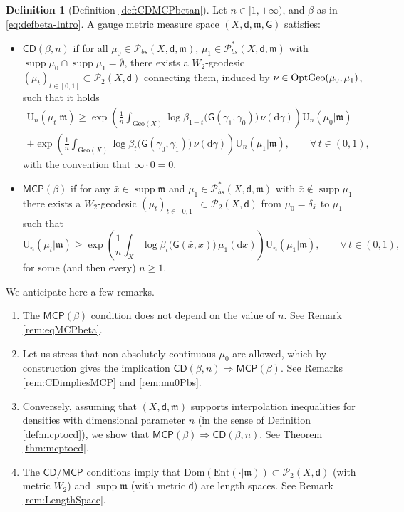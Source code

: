 \documentclass[11pt,a4paper]{article}
\theoremstyle{plain}
\theoremstyle{definition}
\newtheorem*{definition*}{Definition}
\theoremstyle{remark}
\numberwithin{equation}{section}
\DeclareMathOperator{\supp}{\mathrm{supp}}
\newcommand{\CD}{\mathsf{CD}}
\newcommand{\Geo}{\mathrm{Geo}}
\newcommand{\MCP}{\mathsf{MCP}}
\newcommand{\OptGeo}{{\rm OptGeo}}
\newcommand{\Ent}{\mathrm{Ent}}
\newcommand{\U}{\mathrm{U}}
\newcommand{\Dom}{\mathrm{Dom}}
\newcommand{\Prob}{\mathcal{P}}
\newcommand{\di}{\mathrm{d}}
\newcommand{\mm}{\mathfrak m}
\newcommand{\sfd}{\mathsf d}
\newcommand{\sfG}{\mathsf G}
\begin{document}
\begin{definition*}[Definition \ref{def:CDMCPbetan}]%
Let $n\in [1,+\infty)$, and $\beta$ as in \eqref{eq:defbeta-Intro}.  A gauge  metric measure space $(X,\sfd,\mm, \sfG)$ satisfies:
\begin{itemize}
\item $\CD(\beta, n)$ if for all $\mu_0\in \Prob_{bs}(X,\sfd,\mm)$, $\mu_1\in \Prob_{bs}^{*}(X,\sfd,\mm)$ with $\supp \mu_0\cap \supp \mu_1 =\emptyset$,  there exists a $W_2$-geodesic $(\mu_t)_{t\in[0,1]} \subset \Prob_2(X,\sfd)$ connecting them, induced by $\nu\in \OptGeo(\mu_0,\mu_1)$, such that it holds
\begin{multline}\label{eq:defCDbetan-Intro}
\U_{n}(\mu_{t}|\mm)\geq  \exp\left( \frac{1}{n}\int_{\Geo(X)} \log \beta_{1-t}\big(\sfG(\gamma_1,\gamma_0))\, \nu(\di\gamma) \right) \U_{n}(\mu_{0}|\mm)  \\
+\exp\left( \frac{1}{n}\int_{\Geo(X)} \log \beta_{t}\big(\sfG(\gamma_0,\gamma_1)\big) \, \nu(\di\gamma) \right)   \U_{n}(\mu_{1}|\mm), \qquad \forall\, t\in (0,1),
\end{multline}
with the convention that $\infty \cdot 0 = 0$. 
\item $\MCP(\beta)$ if for any $\bar{x} \in \supp\mm$ and $\mu_1\in \Prob_{bs}^{*}(X,\sfd,\mm)$   with $\bar{x}\notin \supp \mu_1$ there exists a $W_2$-geodesic $(\mu_t)_{t\in[0,1]} \subset \Prob_2(X,\sfd)$ from $\mu_0=\delta_{\bar{x}}$ to $\mu_1$ such that
\begin{equation}\label{eq:defMCPbeta-Intro}
\U_{n}(\mu_{t}|\mm)\geq \exp\left( \frac{1}{n}\int_{X}  \log \beta_{t}\big(\sfG(\bar{x},x)\big)  \, \mu_1(\di x) \right) \U_{n}(\mu_{1}|\mm) , \qquad \forall\, t\in (0,1),
\end{equation}
for some (and then every) $n\geq 1$.
\end{itemize}
\end{definition*}

\noindent
We anticipate here a few remarks.
\begin{enumerate}
\item The $\MCP(\beta)$ condition does not depend on the value of $n$. See Remark \ref{rem:eqMCPbeta}.
\item Let us stress that non-absolutely continuous $\mu_0$ are allowed, which by construction gives the implication $\CD(\beta, n) \Rightarrow  \MCP(\beta)$. See Remarks \ref{rem:CDimpliesMCP} and \ref{rem:mu0Pbs}.
\item Conversely, assuming that $(X,\sfd,\mm)$ supports interpolation inequalities for densities  with dimensional parameter $n$ (in the sense of Definition \ref{def:mcptocd}), we show that $\MCP(\beta) \Rightarrow  \CD(\beta,n)$. See Theorem \ref{thm:mcptocd}.
\item The $\CD / \MCP$ conditions  imply that  $\Dom(\Ent(\cdot | \mm))\subset \Prob_{2}(X,\sfd)$  (with metric $W_{2}$) and $\supp \mm$ (with metric $\sfd$) are length spaces.  See Remark \ref{rem:LengthSpace}.
\end{enumerate}
\end{document}
